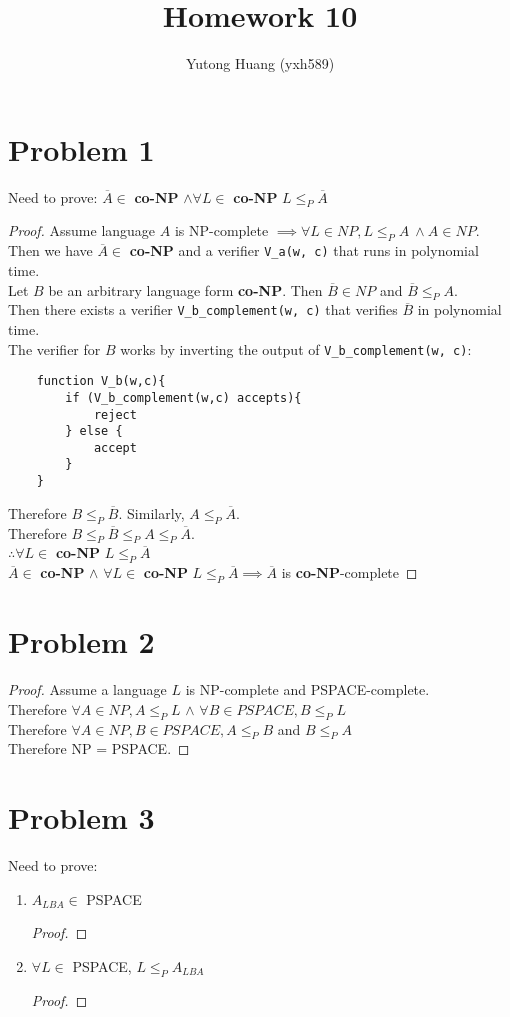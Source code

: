 \documentclass[letterpaper]{article}
\title{\vspace{-2cm}Homework 10}
\author{Yutong Huang (yxh589)}
\date{}
\begin{document}
\maketitle
\section*{Problem 1}
Need to prove: $\overline{A} \in$ \textbf{co-NP} $\land \forall L \in$ \textbf{co-NP} $L \leq_P \overline{A}$
\begin{proof}
    Assume language $A$ is NP-complete $\implies \forall L \in NP, L \leq_P A\  \land A \in NP$.\\
    Then we have $\overline{A} \in $ \textbf{co-NP} and a verifier \verb#V_a(w, c)# that runs in polynomial time.\\
    Let $B$ be an arbitrary language form \textbf{co-NP}. Then $ \overline{B} \in NP $ and $\overline{B} \leq_P A$.\\
    Then there exists a verifier \verb#V_b_complement(w, c)# that verifies $\overline{B}$ in polynomial time.\\

    The verifier for $B$ works by inverting the output of \verb#V_b_complement(w, c)#:
    \begin{verbatim}
    function V_b(w,c){
        if (V_b_complement(w,c) accepts){
            reject
        } else {
            accept
        }
    }
    \end{verbatim}
    Therefore $B \leq_P \overline{B}$. Similarly, $A \leq_P \overline{A}$.\\
    Therefore $B \leq_P \overline{B} \leq_P A \leq_P \overline{A}$.\\
    $\therefore \forall L \in$  \textbf{co-NP} $L \leq_P \overline{A}$\\

    $ \overline{A} \in $ \textbf{co-NP} $\land$ $\forall L \in$  \textbf{co-NP} $L \leq_P \overline{A} \implies \overline{A}$ is \textbf{co-NP}-complete
\end{proof}

\section*{Problem 2}
\begin{proof}
    Assume a language $L$ is NP-complete and PSPACE-complete.\\
    Therefore $\forall A \in NP, A \leq_P L$ $\land$ $\forall B \in PSPACE, B \leq_P L$\\
    Therefore $\forall A \in NP, B \in PSPACE, A \leq_P B$ and $B \leq_P A$\\
    Therefore NP = PSPACE.
\end{proof}

\section*{Problem 3}
Need to prove:
\begin{enumerate}
    \item $A_{LBA} \in$ PSPACE \begin{proof}
        
    \end{proof}
    \item $\forall L \in$ PSPACE, $L\leq_P A_{LBA}$ \begin{proof}
        
    \end{proof}
\end{enumerate}
\end{document}
